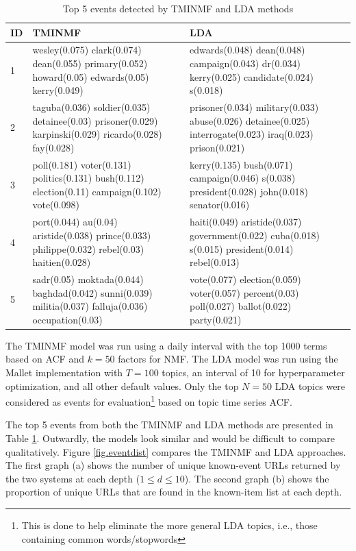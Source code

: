\documentclass{sig-alternate}
\begin{document}
\begin{table}
\scriptsize
\begin{tabular}{| p{0.2cm} | p{3.5cm} | p{3.5cm} | } \hline
{\bf ID } & {\bf TMINMF} & {\bf LDA } \\ \hline
1 & wesley(0.075) clark(0.074) dean(0.055) primary(0.052) howard(0.05) edwards(0.05) kerry(0.049) & 
edwards(0.048) dean(0.048) campaign(0.043) dr(0.034) kerry(0.025) candidate(0.024) s(0.018)   \\ \hline
2 & taguba(0.036) soldier(0.035) detainee(0.03) prisoner(0.029) karpinski(0.029) ricardo(0.028) fay(0.028)   &
prisoner(0.034) military(0.033) abuse(0.026) detainee(0.025) interrogate(0.023) iraq(0.023) prison(0.021)  \\ \hline
3 & poll(0.181) voter(0.131) politics(0.131) bush(0.112) election(0.11) campaign(0.102) vote(0.098)  &
kerry(0.135) bush(0.071) campaign(0.046) s(0.038) president(0.028) john(0.018) senator(0.016) \\ \hline
4 & port(0.044) au(0.04) aristide(0.038) prince(0.033) philippe(0.032) rebel(0.03) haitien(0.028) &
haiti(0.049) aristide(0.037) government(0.022) cuba(0.018) s(0.015) president(0.014) rebel(0.013)  \\ \hline
5 & sadr(0.05) moktada(0.044) baghdad(0.042) sunni(0.039) militia(0.037) falluja(0.036) occupation(0.03)  &
vote(0.077) election(0.059) voter(0.057) percent(0.03) poll(0.027) ballot(0.022) party(0.021) \\ \hline
\end{tabular}
\caption{Top 5 events detected by TMINMF and LDA methods}
\label{table.top5}
\end{table}

The TMINMF model was run using a daily interval with the top 1000 terms based on ACF and $k=50$ factors for NMF. The LDA model was run using the Mallet implementation with $T=100$ topics, an interval of 10 for hyperparameter optimization, and all other default values. Only the top $N=50$ LDA topics were considered as events for evaluation\footnote{This is done to help eliminate the more general LDA topics, i.e., those containing common words/stopwords} based on topic time series ACF.

The top 5 events from both the TMINMF and LDA methods are presented in Table \ref{table.top5}. Outwardly, the models look similar and would be difficult to compare qualitatively.  Figure \ref{fig.eventdist} compares the TMINMF and LDA approaches.  The first graph (a) shows the number of unique known-event URLs returned by the two systems at each depth ($1 \le d \le 10$).  The second graph (b) shows the proportion of unique URLs that are found in the known-item list  at each depth.
\end{document}
